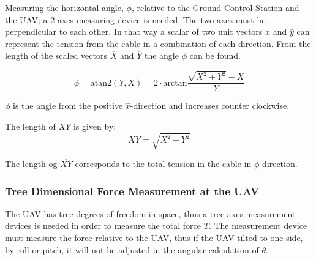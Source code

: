 \noindent
Measuring the horizontal angle, $\phi$, relative to the Ground Control Station and the UAV; a 2-axes measuring device is needed. The two axes must be perpendicular to each other. In that way a scalar of two unit vectors $\hat{x}$ and $\hat{y}$ can represent the tension from the cable in a combination of each direction. 
From the length of the scaled vectors $\overline{X}$ and $\overline{Y}$ the angle $\phi$ can be found.

\begin{equation}
\phi = \mathrm{atan2} (Y,  X) = 2 \cdot \mathrm{arctan} \frac{\sqrt{X^2+Y^2}-X}{Y}
\end{equation}

\noindent
$\phi$ is the angle from the positive $\hat{x}$-direction and increases counter clockwise. 

\noindent
The length of $\overline{XY}$ is given by:
\begin{equation}
\overline{XY} = \sqrt{X^2+Y^2}
\end{equation}

\noindent
The length og $\overline{XY}$ corresponds to the total tension in the cable in $\phi$ direction. 

\subsubsection{Tree Dimensional Force Measurement at the UAV}
The UAV has tree degrees of freedom in space, thus a tree axes measurement devices is needed in order to measure the total force $T$.  The measurement device must measure the force relative to the UAV, thus if the UAV tilted to one side, by roll or pitch, it will not be adjusted in the angular calculation of $\theta$.  

